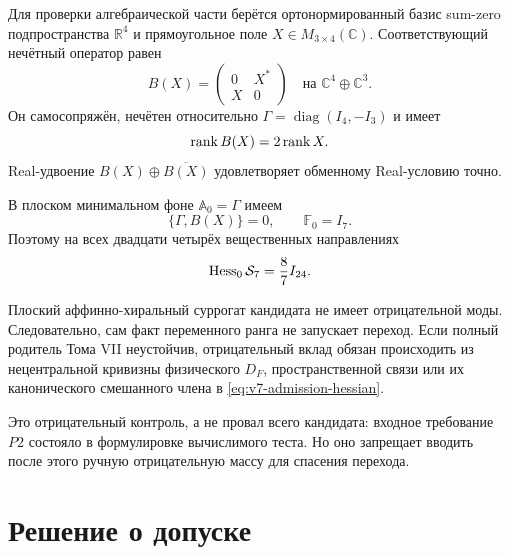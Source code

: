 Для проверки алгебраической части берётся ортонормированный базис
sum-zero подпространства $\mathbb R^4$ и прямоугольное поле
$X\in M_{3\times4}(\mathbb C)$. Соответствующий нечётный оператор равен
\begin{equation}
 B(X)=
 \begin{pmatrix}
  0&X^*\\
  X&0
 \end{pmatrix}
 \quad\text{на }\mathbb C^4\oplus\mathbb C^3.
\end{equation}
Он самосопряжён, нечётен относительно
$\Gamma=\operatorname{diag}(I_4,-I_3)$ и имеет
\begin{equation}
 \operatorname{rank} B(X)=2\operatorname{rank} X.
\end{equation}
Real-удвоение $B(X)\oplus\overline{B(X)}$ удовлетворяет обменному
Real-условию точно.

В плоском минимальном фоне $\mathbb A_0=\Gamma$ имеем
\begin{equation}
 \{\Gamma,B(X)\}=0,
 \qquad
 \mathbb F_0=I_7.
\end{equation}
Поэтому на всех двадцати четырёх вещественных направлениях
\begin{equation}
 \operatorname{Hess}_0\mathcal S_7=\frac87I_{24}.
 \label{eq:v7-flat-surrogate-hessian}
\end{equation}

\begin{theorem}
Плоский аффинно-хиральный суррогат кандидата не имеет отрицательной моды.
Следовательно, сам факт переменного ранга не запускает переход. Если полный
родитель Тома VII неустойчив, отрицательный вклад обязан происходить из
нецентральной кривизны физического $D_F$, пространственной связи или их
канонического смешанного члена в \eqref{eq:v7-admission-hessian}.
\end{theorem}

Это отрицательный контроль, а не провал всего кандидата: входное требование
$P2$ состояло в формулировке вычислимого теста. Но оно запрещает вводить после
этого ручную отрицательную массу для спасения перехода.

\section{Решение о допуске}

